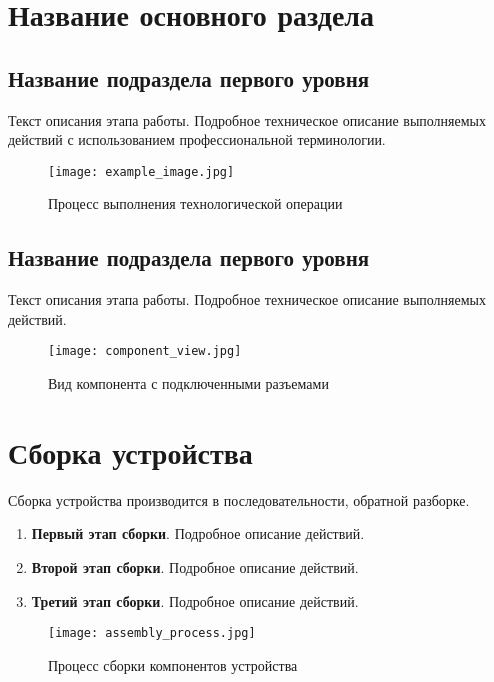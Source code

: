 \documentclass[a4paper,14pt]{article}
\begin{document}
\section{Название основного раздела}

\subsection{Название подраздела первого уровня}

Текст описания этапа работы. Подробное техническое описание выполняемых действий с использованием профессиональной терминологии.

\begin{figure}[H]
\centering
\texttt{[image: example\_image.jpg]}
\caption{Процесс выполнения технологической операции}
\end{figure}

\subsection{Название подраздела первого уровня}

Текст описания этапа работы. Подробное техническое описание выполняемых действий.

\begin{figure}[H]
\centering
\texttt{[image: component\_view.jpg]}
\caption{Вид компонента с подключенными разъемами}
\end{figure}

\section{Сборка устройства}

Сборка устройства производится в последовательности, обратной разборке.

\begin{enumerate}
\item \textbf{Первый этап сборки}. Подробное описание действий.
\item \textbf{Второй этап сборки}. Подробное описание действий.
\item \textbf{Третий этап сборки}. Подробное описание действий.
\end{enumerate}

\begin{figure}[H]
\centering
\texttt{[image: assembly\_process.jpg]}
\caption{Процесс сборки компонентов устройства}
\end{figure}
\end{document}
